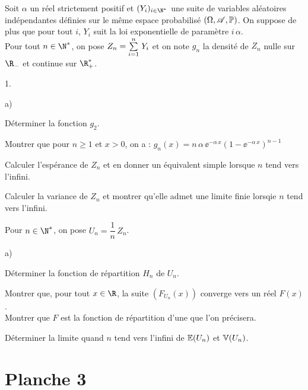 \documentclass[11pt]{article}%
\begin{document}
\noindent
Soit $\alpha$ un réel strictement positif et $(Y_i)_{i\in\N^*}$ une 
suite de variables aléatoires indépendantes définies sur le même espace 
probabilisé $(\Omega, \mathscr{A}, \mathbb{P})$. On suppose de plus que pour tout 
$i$, $Y_i$ suit la loi exponentielle de paramètre $i \, \alpha$.\\
Pour tout $n\in\N^*$, on pose $Z_n={\textstyle\sum\limits_{i=1}^{n}}\hspace{.1cm} Y_i$ et on note $g_n$ 
la densité de $Z_n$ nulle sur $\R_-$ et continue sur $\R_+^*$.
\begin{noliste}{1.}
 \item 
 \begin{noliste}{a)}
  \item Déterminer la fonction $g_2$.
  \item Montrer que pour $n\geq 1$ et $x>0$, on a : $g_n(x) =
  n \, \alpha \, \ee^{-\alpha \, x}\left(1-\ee^{-\alpha \, 
  x}\right)^{n-1}$
  \item Calculer l'espérance de $Z_n$ et en donner un équivalent simple 
  lorsque $n$ tend vers l'infini.
  \item Calculer la variance de $Z_n$ et montrer qu'elle admet une 
  limite finie lorsqie $n$ tend vers l'infini.
 \end{noliste}
 
 \item Pour $n\in\N^*$, on pose $U_n=\dfrac{1}{n} \, Z_n$.
 \begin{noliste}{a)}
  \item Déterminer la fonction de répartition $H_n$ de $U_n$.
  \item Montrer que, pour tout $x\in\R$, la suite $(F_{U_n}(x))$ 
  converge vers un réel $F(x)$.\\
  Montrer que $F$ est la fonction de répartition d'une \var que l'on 
  précisera.
  \item Déterminer la limite quand $n$ tend vers l'infini de $\mathbb{E}(U_n)$ 
  et $\mathbb{V}(U_n)$.
 \end{noliste}
\end{noliste}


\newpage


\section*{Planche 3} %
\end{document}
